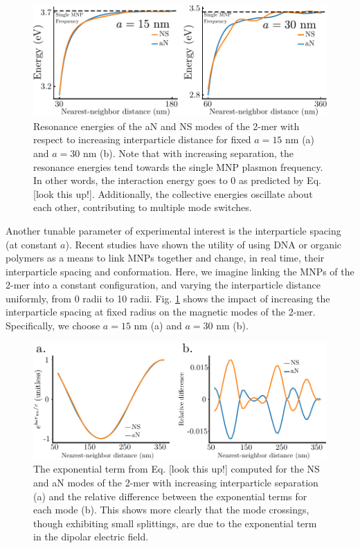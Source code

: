 \documentclass [11pt, proquest] {uwthesis}[2016/11/22]
\begin{document}
\begin{figure}
\begin{centering}
\includegraphics{spacing_2mer.pdf}
\caption{Resonance energies of the aN and NS modes of the 2-mer with respect to increasing interparticle distance for fixed $a=15$ nm (a) and $a=30$ nm (b). Note that with increasing separation, the resonance energies tend towards the single MNP plasmon frequency. In other words, the interaction energy goes to 0 as predicted by Eq. [look this up!]. Additionally, the collective energies oscillate about each other, contributing to multiple mode switches.}
\label{spacing_eig}
\end{centering}
\end{figure}


Another tunable parameter of experimental interest is the interparticle spacing (at constant $a$). Recent studies have shown the utility of using DNA or organic polymers as a means to link MNPs together and change, in real time, their interparticle spacing and conformation\cite{DanLuo2009,NaLiu2017,Ginger2017}. Here, we imagine linking the MNPs of the 2-mer into a constant configuration, and varying the interparticle distance uniformly, from 0 radii to 10 radii. Fig. \ref{spacing_eig} shows the impact of increasing the interparticle spacing at fixed radius on the magnetic modes of the 2-mer. Specifically, we choose $a=15$ nm (a) and $a=30$ nm (b).


\begin{figure}
\begin{centering}
\includegraphics{diff_avg_space.pdf}
\caption{The exponential term from Eq. [look this up!] computed for the NS and aN modes of the 2-mer with increasing interparticle separation (a) and the relative difference between the exponential terms for each mode (b). This shows more clearly that the mode crossings, though exhibiting small splittings, are due to the exponential term in the dipolar electric field.}
\label{diff_avg_space}
\end{centering}
\end{figure}
\end{document}

